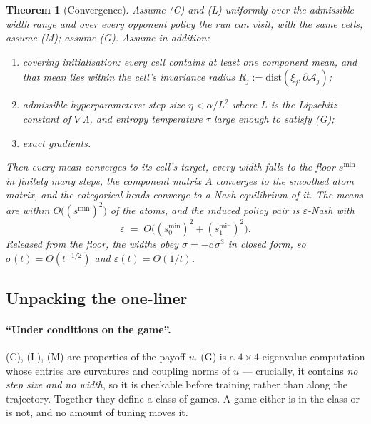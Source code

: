 \documentclass[11pt]{article}
\newtheorem{theorem}{Theorem}
\theoremstyle{definition}
\newcommand{\cA}{\mathcal{A}}
\begin{document}
\begin{theorem}[Convergence]\label{thm:main}
Assume (C) and (L) uniformly over the admissible width range and over every
opponent policy the run can visit, with the same cells; assume (M); assume (G).
Assume in addition:
\begin{enumerate}[leftmargin=1.8em, itemsep=2pt]
\item[(a)] \emph{covering initialisation}: every cell contains at least one
  component mean, and that mean lies within the cell's \emph{invariance radius}
  $R_j := \mathrm{dist}(\xi_j, \partial \cA_j)$;
\item[(b)] \emph{admissible hyperparameters}: step size $\eta < \alpha/L^2$
  where $L$ is the Lipschitz constant of $\nabla\Lambda$, and entropy temperature
  $\tau$ large enough to satisfy (G);
\item[(c)] \emph{exact gradients}.
\end{enumerate}
Then every mean converges to its cell's target, every width falls to the floor
$s^{\min}$ in finitely many steps, the component matrix $\bar A$ converges to the
smoothed atom matrix, and the categorical heads converge to a Nash equilibrium of
it. The means are within $O\big((s^{\min})^2\big)$ of the atoms, and the induced
policy pair is $\varepsilon$-Nash with
\begin{equation}\label{eq:eps}
  \varepsilon \;=\; O\!\big((s_0^{\min})^2 + (s_1^{\min})^2\big) .
\end{equation}
Released from the floor, the widths obey $\dot\sigma = -c\,\sigma^3$ in closed
form, so $\sigma(t) = \Theta(t^{-1/2})$ and $\varepsilon(t) = \Theta(1/t)$.
\end{theorem}

\subsection*{Unpacking the one-liner}

\paragraph{``Under conditions on the game''.}
(C), (L), (M) are properties of the payoff $u$. (G) is a $4\times4$ eigenvalue
computation whose entries are curvatures and coupling norms of $u$ --- crucially,
it contains \emph{no step size and no width}, so it is checkable before training
rather than along the trajectory. Together they define a class of games. A game
either is in the class or is not, and no amount of tuning moves it.
\end{document}
